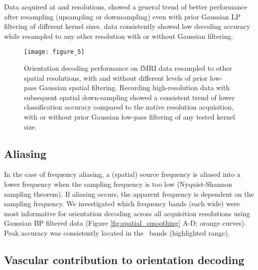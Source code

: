 Data acquired at  and  resolutions, showed a general 
trend of better performance after resampling (upsampling or downsampling)
even with prior Gaussian LP filtering of different kernel sizes.  
data consistently showed low decoding accuracy while resampled to any other 
resolution with or without Gaussian filtering. 



\begin{figure}
  \centering

    \texttt{[image: figure\_5]}
  \caption{Orientation decoding performance on fMRI data resampled to other
    spatial resolutions, with and without different levels of prior low-pass
    Gaussian spatial filtering. Recording high-resolution data with subsequent
    spatial down-sampling showed a consistent trend of lower classification accuracy
    compared to the native resolution acquisition, with or without prior
    Gaussian low-pass filtering of any tested kernel size.}
    \label{fig:resample}
\end{figure}


\subsection*{Aliasing}

\noindent In the case of frequency aliasing, a (spatial) source frequency is aliased into
a lower frequency when the sampling frequency is too low (Nyquist-Shannon
sampling theorem). If aliasing occurs, the apparent frequency is dependent on
the sampling frequency. We investigated which frequency bands (each 
wide) were most informative for orientation decoding across all acquisition
resolutions using Gaussian BP filtered data (Figure \ref{fig:spatial_smoothing}
A-D; orange curves). Peak accuracy was consistently located in the
\bandofinterest\ bands (highlighted range).


\subsection*{Vascular contribution to orientation decoding}
%

